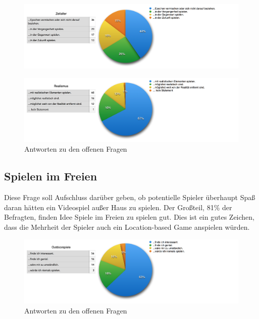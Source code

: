 \begin{figure}[H]
    \centering
    \includegraphics[width=1.01\textwidth]{files/umfrage/zeitalter}
\end{figure}

\begin{figure}[H]
    \centering
    \includegraphics[width=1.01\textwidth]{files/umfrage/realismus}
    \caption{Antworten zu den offenen Fragen}
\end{figure}


\subsection{Spielen im Freien} 
Diese Frage soll Aufschluss darüber geben, ob potentielle Spieler überhaupt Spaß daran hätten ein Videospiel außer Haus zu spielen. Der Großteil, 81\% der Befragten, finden Idee Spiele im Freien zu spielen gut. Dies ist ein gutes Zeichen, dass die Mehrheit der Spieler auch ein Location-based Game anspielen würden. 

\begin{figure}[H]
    \centering
    \includegraphics[width=1.01\textwidth]{files/umfrage/outdoorspiele}
    \caption{Antworten zu den offenen Fragen}
\end{figure}


